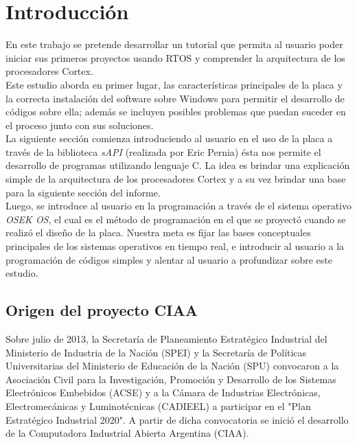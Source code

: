 \documentclass[12pt,letterpaper]{article}
\author{}
\date{}
\begin{document}


\tableofcontents

\section{Introducci\'on}
En este trabajo se pretende desarrollar un tutorial que permita al usuario poder iniciar sus primeros proyectos usando RTOS y comprender la arquitectura de los procesadores Cortex.
  \\
  
Este estudio aborda en primer lugar, las características principales de la placa y la correcta instalación del software sobre Windows para permitir el desarrollo de códigos sobre ella; además se incluyen posibles problemas que puedan suceder en el proceso junto con sus soluciones.
  \\

La siguiente sección comienza introduciendo al usuario en el uso de la placa a través de la biblioteca \textit{sAPI} (realizada por Eric Pernia) ésta nos permite el desarrollo de programas utilizando lenguaje C. La idea es brindar una explicación simple de la arquitectura de los procesadores Cortex y a su vez brindar una base para la siguiente sección del informe.
  \\

Luego, se introduce al usuario en la programación a través de el sistema operativo \textit{OSEK OS}, el cual es el método de programación en el que se proyectó cuando se realizó el diseño de la placa. Nuestra meta es fijar las bases conceptuales principales de los sistemas operativos en tiempo real, e introducir al usuario a la programación de códigos simples y alentar al usuario a profundizar sobre este estudio.

\subsection{Origen del proyecto CIAA}
Sobre julio de 2013, la Secretaría de Planeamiento Estratégico Industrial del Ministerio de Industria de la Nación (SPEI) y la Secretaría de Políticas Universitarias del Ministerio de Educación de la Nación (SPU) convocaron a la Asociación Civil para la Investigación, Promoción y Desarrollo de los Sistemas Electrónicos Embebidos (ACSE) y a la Cámara de Industrias Electrónicas, Electromecánicas y Luminotécnicas (CADIEEL) a participar en el "Plan Estratégico Industrial 2020". A partir de dicha convocatoria se inició el desarrollo de la Computadora Industrial Abierta Argentina (CIAA).
  \\
\end{document}
